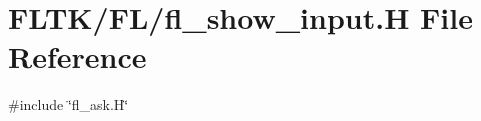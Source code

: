 \hypertarget{fl__show__input_8_h}{}\section{F\+L\+T\+K/\+F\+L/fl\+\_\+show\+\_\+input.H File Reference}
\label{fl__show__input_8_h}
{\ttfamily \#include \char`\"{}fl\+\_\+ask.\+H\char`\"{}}\newline
